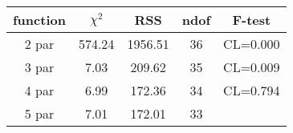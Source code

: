 \begin{tabular}{c|c|c|c|c}
function & $\chi^2$ & RSS & ndof & F-test \\
\hline
2 par & 574.24 & 1956.51 & 36 & CL=0.000 \\
3 par & 7.03 & 209.62 & 35 & CL=0.009 \\
4 par & 6.99 & 172.36 & 34 & CL=0.794 \\
5 par & 7.01 & 172.01 & 33 & \\
\hline
\end{tabular}